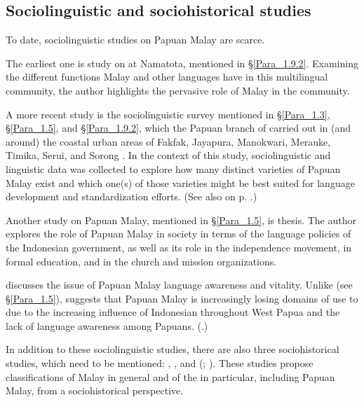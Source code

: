 {\subsection{Sociolinguistic and sociohistorical studies}
\label{Para_1.9.3}
To date, sociolinguistic studies on Papuan Malay are scarce.



The earliest one is  study on  at Namatota, mentioned in §\ref{Para_1.9.2}. Examining the different functions Malay and other languages have in this multilingual community, the author highlights the pervasive role of Malay in the community.



A more recent study is the sociolinguistic survey mentioned in §\ref{Para_1.3}, §\ref{Para_1.5}, and §\ref{Para_1.9.2}, which the Papuan branch of  carried out in (and around) the coastal urban areas of Fakfak, Jayapura, Manokwari, Merauke, Timika, Serui, and Sorong \citep{Scott.2008}. In the context of this study, sociolinguistic and linguistic data was collected to explore how many distinct varieties of Papuan Malay exist and which one(s) of those varieties might be best suited for language development and standardization efforts. (See also  on p. \pageref{Figure_0.2}.)



Another study on Papuan Malay, mentioned in §\ref{Para_1.5}, is  thesis. The author explores the role of Papuan Malay in society in terms of the language policies of the Indonesian government, as well as its role in the independence movement, in formal education, and in the church and mission organizations.



\citet{Burung.2008} discusses the issue of Papuan Malay language awareness and vitality. Unlike \citet[10–17]{Scott.2008} (see §\ref{Para_1.5}), \citet{Burung.2008} suggests that Papuan Malay is increasingly losing domains of use to  due to the increasing influence of Indonesian throughout West Papua and the lack of language awareness among Papuans. (\citealt[See also][]{Burung.2009}.)



In addition to these sociolinguistic studies, there are also three sociohistorical studies, which need to be mentioned: \citet{Adelaar.1996}, \citet{Gil.1997}, and \citeauthor{Paauw.2005} (\citeyear*{Paauw.2005}; \citeyear*{Paauw.2007}). These studies propose classifications of Malay in general and of the  in particular, including Papuan Malay, from a sociohistorical perspective.



}
